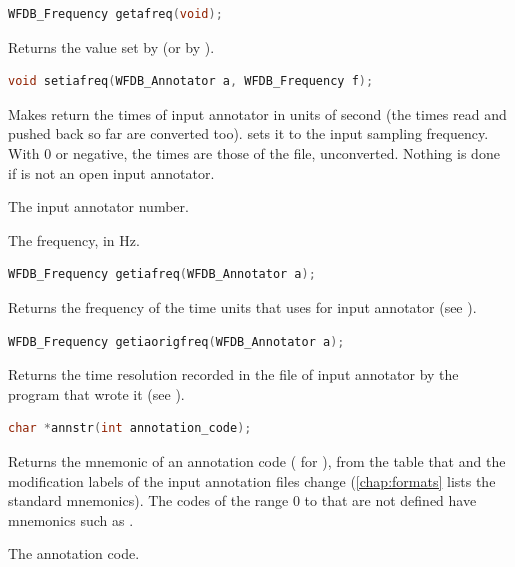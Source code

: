\begin{lstlisting}[language=C,style=signature]
WFDB_Frequency getafreq(void);
\end{lstlisting}
Returns the value set by  (or by ).

\begin{lstlisting}[language=C,style=signature]
void setiafreq(WFDB_Annotator a, WFDB_Frequency f);
\end{lstlisting}
Makes  return the times of input annotator  in units of
 second (the times read and pushed back so far are converted too).
 sets it to the input sampling frequency. With  0 or
negative, the times are those of the file, unconverted. Nothing is done if
 is not an open input annotator.
\begin{params}
\item[a] The input annotator number.
\item[f] The frequency, in Hz.
\end{params}

\begin{lstlisting}[language=C,style=signature]
WFDB_Frequency getiafreq(WFDB_Annotator a);
\end{lstlisting}
Returns the frequency of the time units that  uses for input
annotator  (see ).

\begin{lstlisting}[language=C,style=signature]
WFDB_Frequency getiaorigfreq(WFDB_Annotator a);
\end{lstlisting}
Returns the time resolution recorded in the file of input annotator 
by the program that wrote it (see ).

\begin{lstlisting}[language=C,style=signature]
char *annstr(int annotation_code);
\end{lstlisting}
Returns the mnemonic of an annotation code ( for ),
from the table that  and the modification labels of the input
annotation files change (\cref{chap:formats} lists the standard mnemonics).
The codes of the range 0 to  that are not defined have mnemonics
such as .
\begin{params}
\item[annotation\_code] The annotation code.
\end{params}

